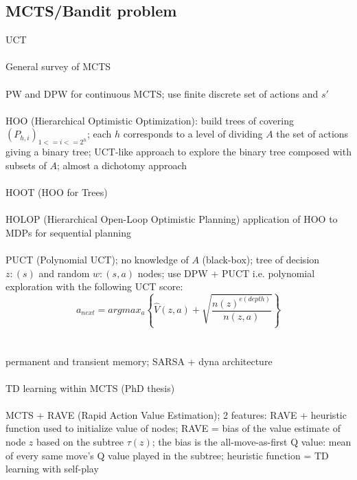 \documentclass[]{article}
\begin{document}
\subsection*{MCTS/Bandit problem}
\noindent \cite{kocsis2006bandit} UCT\\\\
\noindent \cite{browne2012survey} General survey of MCTS\\\\
\noindent \cite{couetoux2011continuous} PW and DPW for continuous MCTS; use finite discrete set of actions and $s'$\\\\
\noindent \cite{bubeck2009online} HOO (Hierarchical Optimistic Optimization): build trees of covering $(P_{h,i})_{1 <= i <= 2^h}$; each $h$ corresponds to a level of dividing $A$ the set of actions giving a binary tree; UCT-like approach to explore the binary tree composed with subsets of $A$; almost a dichotomy approach\\\\
\noindent \cite{mansley2011sample} HOOT (HOO for Trees)\\\\
\noindent \cite{weinstein2012bandit} HOLOP (Hierarchical Open-Loop Optimistic Planning) application of HOO to MDPs for sequential planning\\\\
\noindent \cite{auger2013continuous} PUCT (Polynomial UCT); no knowledge of $A$ (black-box); tree of decision $z:(s)$ and random $w:(s,a)$ nodes; use DPW + PUCT i.e. polynomial exploration with the following UCT score:
\begin{equation*}
	a_{next} = argmax_a \left\{ \widehat{V}(z,a) + \sqrt{\frac{n(z)^{e(depth)}}{n(z,a)}} \right\}
\end{equation*}\\\\
\noindent \cite{silver2008sample} permanent and transient memory; SARSA + dyna architecture\\\\
\noindent \cite{deleva2015td} TD learning within MCTS (PhD thesis)\\\\
\noindent \cite{gelly2011monte} MCTS + RAVE (Rapid Action Value Estimation); 2 features: RAVE + heuristic function used to initialize value of nodes; RAVE = bias of the value estimate of node $z$ based on the subtree $\tau (z)$; the bias is the all-move-as-first Q value: mean of every same move's Q value played in the subtree; heuristic function = TD learning with self-play
\end{document}
